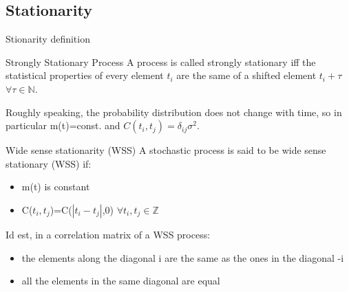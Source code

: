 \documentclass[
10pt,
aspectratio=169,
]{beamer}
\begin{document}
\subsection{Stationarity}
\begin{frame}{Stionarity definition}
\begin{block}{Strongly Stationary Process}
    A process is called strongly stationary iff the statistical properties of every element $t_i$ are the same of a shifted element $t_i+\tau$ $\forall\tau\in\mathbb{N}$.
\end{block}
Roughly speaking, the probability distribution does not change with time, so in particular m(t)=const. and $C(t_i,t_j)=\delta_{ij}\sigma^2$.
\begin{block}{Wide sense stationarity (WSS)}
    A stochastic process is said to be wide sense stationary (WSS) if:
    \begin{itemize}
\item  m(t) is constant

\item  C($t_i,t_j$)=C($| t_i - t_j |$,0) $\forall t_i , t_j \in \mathbb{Z}$
\end{itemize}
\end{block}
    Id est, in a correlation matrix of a WSS process:
    \begin{itemize}
        \item the elements along the diagonal i are the same as the ones in the diagonal -i
        \item all the elements in the same diagonal are equal
    \end{itemize}
\end{frame}
\end{document}
